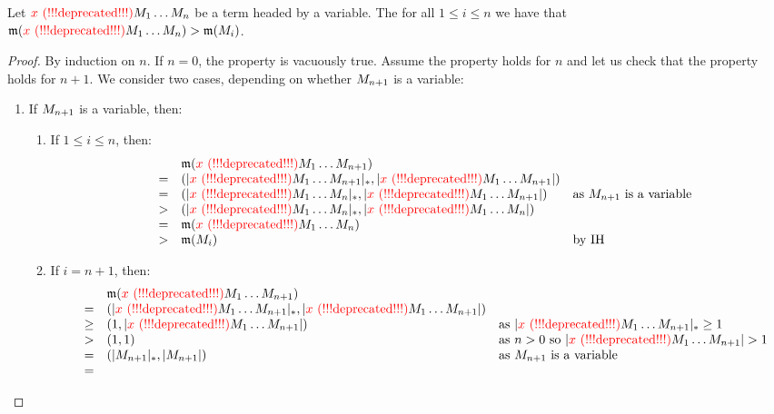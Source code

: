 \begin{lemma}
\label{lemma:sizeVar_neutral}
Let $\textcolor{red}{x \text{\,\,(!!!deprecated!!!)}}M_1\hdots M_n$ be a term headed by a variable.
The for all $1 \leq i \leq n$
we have that $\mathfrak{m}(\textcolor{red}{x \text{\,\,(!!!deprecated!!!)}}M_1\hdots M_n) > \mathfrak{m}(M_i)$.
\end{lemma}
\begin{proof}
By induction on $n$.
If $n = 0$, the property is vacuously true.
Assume the property holds for $n$ and let us check that the property holds
for $n + 1$. We consider two cases, depending on whether $M_{n+1}$ is
a variable:
\begin{enumerate}
\item
  If $M_{n+1}$ is a variable,
  then:
  \begin{enumerate}
  \item
    If $1 \leq i \leq n$, then:
    \[
      \begin{array}{rcll}
      &&
        \mathfrak{m}(\textcolor{red}{x \text{\,\,(!!!deprecated!!!)}}M_1\hdots M_{n+1})
      \\
      & = &
        (\lvert\textcolor{red}{x \text{\,\,(!!!deprecated!!!)}}M_1\hdots M_{n+1}\rvert_*, \lvert\textcolor{red}{x \text{\,\,(!!!deprecated!!!)}}M_1\hdots M_{n+1}\rvert)
      \\
      & = &
        (\lvert\textcolor{red}{x \text{\,\,(!!!deprecated!!!)}}M_1\hdots M_{n}\rvert_*, \lvert\textcolor{red}{x \text{\,\,(!!!deprecated!!!)}}M_1\hdots M_{n+1}\rvert)
        & \text{as $M_{n+1}$ is a variable}
      \\
      & > &
        (\lvert\textcolor{red}{x \text{\,\,(!!!deprecated!!!)}}M_1\hdots M_{n}\rvert_*, \lvert\textcolor{red}{x \text{\,\,(!!!deprecated!!!)}}M_1\hdots M_{n}\rvert)
      \\
      & = &
        \mathfrak{m}(\textcolor{red}{x \text{\,\,(!!!deprecated!!!)}}M_1\hdots M_{n})
      \\
      & > &
        \mathfrak{m}(M_i)
        & \text{by IH}
      \end{array}
    \]
  \item
    If $i = n + 1$, then:
    \[
      \begin{array}{rcll}
      &&
        \mathfrak{m}(\textcolor{red}{x \text{\,\,(!!!deprecated!!!)}}M_1\hdots M_{n+1})
      \\
      & = &
        (\lvert\textcolor{red}{x \text{\,\,(!!!deprecated!!!)}}M_1\hdots M_{n+1}\rvert_*, \lvert\textcolor{red}{x \text{\,\,(!!!deprecated!!!)}}M_1\hdots M_{n+1}\rvert)
      \\
      & \geq &
        (1, \lvert\textcolor{red}{x \text{\,\,(!!!deprecated!!!)}}M_1\hdots M_{n+1}\rvert)
        & \text{as $\lvert\textcolor{red}{x \text{\,\,(!!!deprecated!!!)}}M_1\hdots M_{n+1}\rvert_* \geq 1$}
      \\
      & > &
        (1, 1)
        & \text{as $n > 0$ so $\lvert\textcolor{red}{x \text{\,\,(!!!deprecated!!!)}}M_1\hdots M_{n+1}\rvert > 1$}
      \\
      & = &
        (\lvert M_{n+1}\rvert_*, \lvert M_{n+1}\rvert)
        & \text{as $M_{n+1}$ is a variable}
      \\
      & = &

\end{array}\]
\end{enumerate}
\end{enumerate}
\end{proof}
